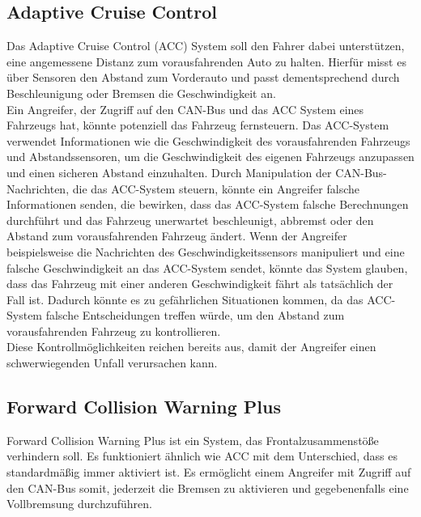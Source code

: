 \subsection{Adaptive Cruise Control}
Das Adaptive Cruise Control (ACC) System soll den Fahrer dabei unterstützen, eine angemessene Distanz zum vorausfahrenden Auto zu halten. Hierfür misst es über Sensoren den Abstand zum Vorderauto und passt dementsprechend durch Beschleunigung oder Bremsen die Geschwindigkeit an. \\
Ein Angreifer, der Zugriff auf den \acs{CAN}-Bus und das \acs{ACC} System eines Fahrzeugs hat, könnte potenziell das Fahrzeug fernsteuern. Das ACC-System verwendet Informationen wie die Geschwindigkeit des vorausfahrenden Fahrzeugs und Abstandssensoren, um die Geschwindigkeit des eigenen Fahrzeugs anzupassen und einen sicheren Abstand einzuhalten. Durch Manipulation der \acs{CAN}-Bus-Nachrichten, die das \acs{ACC}-System steuern, könnte ein Angreifer falsche Informationen senden, die bewirken, dass das \acs{ACC}-System falsche Berechnungen durchführt und das Fahrzeug unerwartet beschleunigt, abbremst oder den Abstand zum vorausfahrenden Fahrzeug ändert.
Wenn der Angreifer beispielsweise die Nachrichten des Geschwindigkeitssensors manipuliert und eine falsche Geschwindigkeit an das \acs{ACC}-System sendet, könnte das System glauben, dass das Fahrzeug mit einer anderen Geschwindigkeit fährt als tatsächlich der Fall ist. Dadurch könnte es zu gefährlichen Situationen kommen, da das \acs{ACC}-System falsche Entscheidungen treffen würde, um den Abstand zum vorausfahrenden Fahrzeug zu kontrollieren.\\
Diese Kontrollmöglichkeiten reichen bereits aus, damit der Angreifer einen schwerwiegenden Unfall verursachen kann.

\subsection{Forward Collision Warning Plus}
Forward Collision Warning Plus ist ein System, das Frontalzusammenstöße verhindern soll. Es funktioniert ähnlich wie \acs{ACC} mit dem Unterschied, dass es standardmäßig immer aktiviert ist. Es ermöglicht einem Angreifer mit Zugriff auf den \acs{CAN}-Bus somit, jederzeit die Bremsen zu aktivieren und gegebenenfalls eine Vollbremsung durchzuführen.

